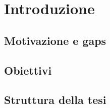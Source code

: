 \chapter{Introduzione}


\section{Motivazione e gaps}

\section{Obiettivi}

\section{Struttura della tesi}
